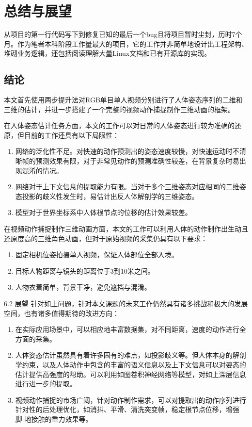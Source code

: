 
\chapter{总结与展望}

从项目的第一行代码写下到修复已知的最后一个bug且将项目暂时尘封，历时7个月。作为笔者本科阶段工作量最大的项目，它的工作并非简单地设计出工程架构、堆砌业务逻辑，还包括阅读理解大量Linux文档和已有开源库的实现。

\section{结论}{}

本文首先使用两步提升法对RGB单目单人视频分别进行了人体姿态序列的二维和三维的估计，并进一步搭建了一个完整的视频动作捕捉制作三维动画的框架。


在人体姿态估计任务方面，本文的工作可以对日常的人体姿态进行较为准确的还原，但目前的工作还具有以下局限性：
\begin{enumerate}
    \item 网络的泛化性不足。对快速的动作预测出的姿态速度较慢，对快速运动时不清晰帧的预测效果有限，对于非常见动作的预测准确性较差，在背景复杂时易出现混淆的情况。
    \item 网络对于上下文信息的提取能力有限。当对于多个三维姿态对应相同的二维姿态投影的歧义性发生时，易估计出反人体解剖学的三维姿态。
    \item 模型对于世界坐标系中人体根节点的位移的估计效果较差。
\end{enumerate}

在视频动作捕捉制作三维动画方面，本文的工作可以利用人体的动作制作出生动且还原度高的三维角色动画，但对于原始视频的采集仍具有以下要求：
\begin{enumerate}
    \item 固定相机位姿拍摄单人视频，保证人体部位全部入境。
    \item 目标人物距离与镜头的距离位于3到10米之间。
    \item 人物衣着简单，背景干净，避免遮挡与混淆。
\end{enumerate}

6.2 展望
针对如上问题，针对本文课题的未来工作仍然具有诸多挑战和极大的发展空间，也有诸多值得期待的改进方向：
\begin{enumerate}
    \item 在实际应用场景中，可以相应地丰富数据集，对不同距离，速度的动作进行全方面的采集。
    \item 人体姿态估计虽然具有着许多固有的难点，如投影歧义等。但人体本身的解剖学约束，以及人体动作中包含的丰富的语义信息以及上下文信息可以对姿态的估计提供高强度的帮助。可以利用如图卷积神经网络等模型，对如上深层信息进行进一步的提取。
    \item 视频动作捕捉的市场广阔，针对动作制作需求，可以对提取出的动作序列进行针对性的后处理优化，如消抖、平滑、清洗突变帧，稳定根节点位移，增强脚-地接触的重力效果等。
\end{enumerate}


